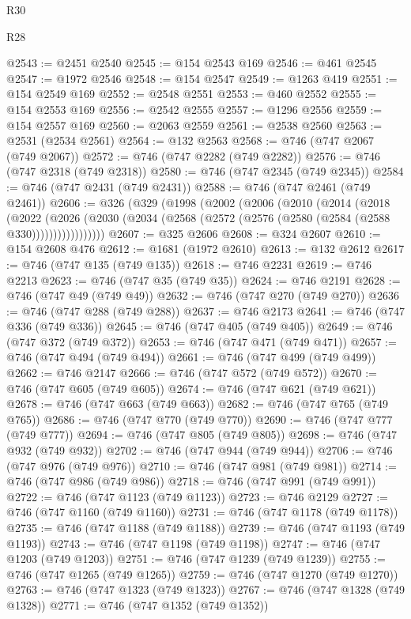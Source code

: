 \begin{lexlean}{R30}
\begin{lexlean}{R28}
\begin{coremodule}
{{{{{{{{{{{{{{{{{{{{{{{{{{{{{{{{{{{{{{{{{{{{{{{{{{{{{{{{{{{{{{{{{{{{{{{{{{{{{{{{{{{{{{{{{{{{{{{{{{{{{{{{{{{{{{{{{{{{{{{{{{{{{{{{{{{{{{{{{{{{{{{@2543 := @2451 @2540
@2545 := @154 @2543 @169
@2546 := @461 @2545
@2547 := @1972 @2546
@2548 := @154 @2547
@2549 := @1263 @419
@2551 := @154 @2549 @169
@2552 := @2548 @2551
@2553 := @460 @2552
@2555 := @154 @2553 @169
@2556 := @2542 @2555
@2557 := @1296 @2556
@2559 := @154 @2557 @169
@2560 := @2063 @2559
@2561 := @2538 @2560
@2563 := @2531 (@2534 @2561)
@2564 := @132 @2563
@2568 := @746 (@747 @2067 (@749 @2067))
@2572 := @746 (@747 @2282 (@749 @2282))
@2576 := @746 (@747 @2318 (@749 @2318))
@2580 := @746 (@747 @2345 (@749 @2345))
@2584 := @746 (@747 @2431 (@749 @2431))
@2588 := @746 (@747 @2461 (@749 @2461))
@2606 := @326
    (@329
      (@1998
        (@2002
          (@2006
            (@2010
              (@2014
                (@2018
                  (@2022
                    (@2026
                      (@2030 (@2034 (@2568 (@2572 (@2576 (@2580 (@2584 (@2588 @330)))))))))))))))))
@2607 := @325 @2606
@2608 := @324 @2607
@2610 := @154 @2608 @476
@2612 := @1681 (@1972 @2610)
@2613 := @132 @2612
@2617 := @746 (@747 @135 (@749 @135))
@2618 := @746 @2231
@2619 := @746 @2213
@2623 := @746 (@747 @35 (@749 @35))
@2624 := @746 @2191
@2628 := @746 (@747 @49 (@749 @49))
@2632 := @746 (@747 @270 (@749 @270))
@2636 := @746 (@747 @288 (@749 @288))
@2637 := @746 @2173
@2641 := @746 (@747 @336 (@749 @336))
@2645 := @746 (@747 @405 (@749 @405))
@2649 := @746 (@747 @372 (@749 @372))
@2653 := @746 (@747 @471 (@749 @471))
@2657 := @746 (@747 @494 (@749 @494))
@2661 := @746 (@747 @499 (@749 @499))
@2662 := @746 @2147
@2666 := @746 (@747 @572 (@749 @572))
@2670 := @746 (@747 @605 (@749 @605))
@2674 := @746 (@747 @621 (@749 @621))
@2678 := @746 (@747 @663 (@749 @663))
@2682 := @746 (@747 @765 (@749 @765))
@2686 := @746 (@747 @770 (@749 @770))
@2690 := @746 (@747 @777 (@749 @777))
@2694 := @746 (@747 @805 (@749 @805))
@2698 := @746 (@747 @932 (@749 @932))
@2702 := @746 (@747 @944 (@749 @944))
@2706 := @746 (@747 @976 (@749 @976))
@2710 := @746 (@747 @981 (@749 @981))
@2714 := @746 (@747 @986 (@749 @986))
@2718 := @746 (@747 @991 (@749 @991))
@2722 := @746 (@747 @1123 (@749 @1123))
@2723 := @746 @2129
@2727 := @746 (@747 @1160 (@749 @1160))
@2731 := @746 (@747 @1178 (@749 @1178))
@2735 := @746 (@747 @1188 (@749 @1188))
@2739 := @746 (@747 @1193 (@749 @1193))
@2743 := @746 (@747 @1198 (@749 @1198))
@2747 := @746 (@747 @1203 (@749 @1203))
@2751 := @746 (@747 @1239 (@749 @1239))
@2755 := @746 (@747 @1265 (@749 @1265))
@2759 := @746 (@747 @1270 (@749 @1270))
@2763 := @746 (@747 @1323 (@749 @1323))
@2767 := @746 (@747 @1328 (@749 @1328))
@2771 := @746 (@747 @1352 (@749 @1352))
}}}}}}}}}}}}}}}}}}}}}}}}}}}}}}}}}}}}}}}}}}}}}}}}}}}}}}}}}}}}}}}}}}}}}}}}}}}}}}}}}}}}}}}}}}}}}}}}}}}}}}}}}}}}}}}}}}}}}}}}}}}}}}}}}}}}}}}}}}}}}}}
\end{coremodule}
\end{lexlean}
\end{lexlean}
